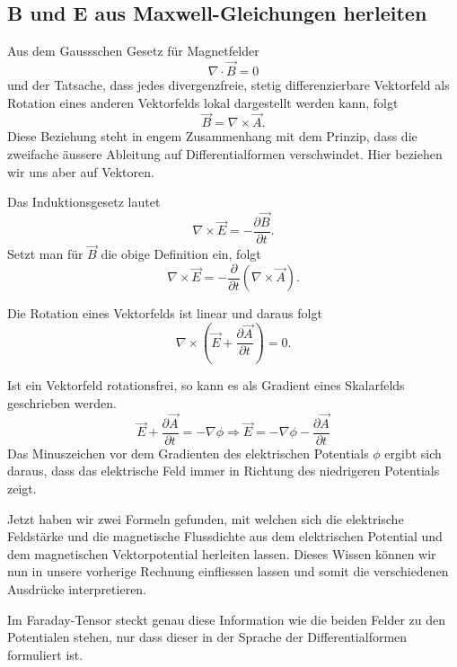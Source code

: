 \subsection{B und E aus Maxwell-Gleichungen herleiten}
Aus dem Gaussschen Gesetz für Magnetfelder
\begin{equation}
	\nabla \cdot \vec{B} = 0
\end{equation}
und der Tatsache, dass jedes divergenzfreie, stetig differenzierbare Vektorfeld als Rotation eines anderen Vektorfelds lokal dargestellt werden kann,
folgt
\begin{equation}
	\vec{B} = \nabla \times \vec{A}.
\end{equation}
Diese Beziehung steht in engem Zusammenhang mit dem Prinzip, dass die zweifache äussere Ableitung auf Differentialformen verschwindet. Hier beziehen wir uns aber auf Vektoren.

Das Induktionsgesetz lautet
\begin{equation}
	\nabla \times \vec{E} = - \frac{\partial \vec{B}}{\partial t}.
\end{equation}
Setzt man für $\vec{B}$ die obige Definition ein, folgt
\begin{equation}
	\nabla \times \vec{E} = - \frac{\partial}{\partial t}(\nabla \times \vec{A}).
\end{equation}

Die Rotation eines Vektorfelds ist linear und daraus folgt
\begin{equation}
	\nabla \times \left( \vec{E} + \frac{\partial \vec{A}}{\partial t}\right) = 0.
\end{equation}

Ist ein Vektorfeld rotationsfrei, so kann es als Gradient eines Skalarfelds geschrieben werden.
\begin{equation}
	\vec{E} + \frac{\partial \vec{A}}{\partial t} = -\nabla \phi \Rightarrow \vec{E} = -\nabla \phi -\frac{\partial \vec{A}}{\partial t}
\end{equation}
Das Minuszeichen vor dem Gradienten des elektrischen Potentials $\phi$ ergibt sich daraus, dass das elektrische Feld immer in Richtung des niedrigeren Potentials zeigt.

Jetzt haben wir zwei Formeln gefunden, mit welchen sich die elektrische Feldstärke und die magnetische Flussdichte aus dem elektrischen Potential und dem magnetischen Vektorpotential herleiten lassen. Dieses Wissen können wir nun in unsere vorherige Rechnung einfliessen lassen und somit die verschiedenen Ausdrücke interpretieren.

Im Faraday-Tensor steckt genau diese Information wie die beiden Felder zu den Potentialen stehen, nur dass dieser in der Sprache der Differentialformen formuliert ist.


